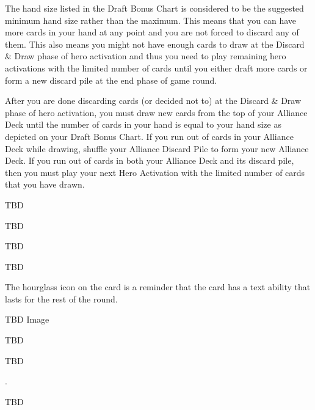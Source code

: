 The hand size listed in the Draft Bonus Chart is considered to be the suggested minimum hand size rather than the maximum. This means that you can have more cards in your hand at any point and you are not forced to discard any of them. This also means you might not have enough cards to draw at the Discard \& Draw phase of hero activation and thus you need to play remaining hero activations with the limited number of cards until you either draft more cards or form a new discard pile at the end phase of game round.

After you are done discarding cards (or decided not to) at the Discard \& Draw phase of hero activation, you must draw new cards from the top of your Alliance Deck until the number of cards in your hand is equal to your hand size as depicted on your Draft Bonus Chart. If you run out of cards in your Alliance Deck while drawing, shuffle your Alliance Discard Pile to form your new Alliance Deck. If you run out of cards in both your Alliance Deck and its discard pile, then you must play your next Hero Activation with the limited number of cards that you have drawn.




TBD

TBD

TBD

TBD

The hourglass icon on the card is a reminder that the card has a text ability that lasts for the rest of the round.

TBD Image

TBD

TBD


.



TBD

